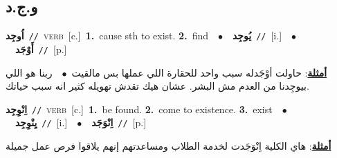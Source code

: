 \documentclass[10pt,a4paper,twoside]{article} %
\begin{document}
\begin{multicols}{2}
{{{{{{{{{\vspace{-3mm}
\subsection*{\color{blue}\foreignlanguage{arabic}{و.ج.د}\color{blue}{}} 

{\setlength\topsep{0pt}\textbf{\foreignlanguage{arabic}{اُوجِد}}\ {\color{gray}\texttt{//}\color{black}}\ \textsc{verb}\ [c.]\ \textbf{1.}~cause sth to exist.  \textbf{2.}~find\ \ $\bullet$\ \ \setlength\topsep{0pt}\textbf{\foreignlanguage{arabic}{يُوجِد}}\ {\color{gray}\texttt{//}\color{black}}\ [i.]\ \ $\bullet$\ \ \setlength\topsep{0pt}\textbf{\foreignlanguage{arabic}{أَوْجَد}}\ {\color{gray}\texttt{//}\color{black}}\ [p.]\  \begin{flushright}\color{gray}\foreignlanguage{arabic}{\textbf{\underline{\foreignlanguage{arabic}{أمثلة}}}: حاولت أوْجَدله سبب واحد للحقارة اللي عملها بس مالقيت\ $\bullet$\ \  ربنا هو اللي بيوجِدنا من العدم مش البشر. عشان هيك تقدش تهويله كثير انه سبب حياتك.}\end{flushright}\color{black}} \vspace{2mm}

{\setlength\topsep{0pt}\textbf{\foreignlanguage{arabic}{اِنْوِجِد}}\ {\color{gray}\texttt{//}\color{black}}\ \textsc{verb}\ [c.]\ \textbf{1.}~be found.  \textbf{2.}~come to existence.  \textbf{3.}~exist\ \ $\bullet$\ \ \setlength\topsep{0pt}\textbf{\foreignlanguage{arabic}{يِنْوِجِد}}\ {\color{gray}\texttt{//}\color{black}}\ [i.]\ \ $\bullet$\ \ \setlength\topsep{0pt}\textbf{\foreignlanguage{arabic}{اِنْوَجَد}}\ {\color{gray}\texttt{//}\color{black}}\ [p.]\  \begin{flushright}\color{gray}\foreignlanguage{arabic}{\textbf{\underline{\foreignlanguage{arabic}{أمثلة}}}: هاي الكلية اِنْوَجَدت لخدمة الطلاب ومساعدتهم إنهم يلاقوا فرص عمل جميلة}\end{flushright}\color{black}} \vspace{2mm}

}}}}}}}}}
\end{multicols}
\end{document}
